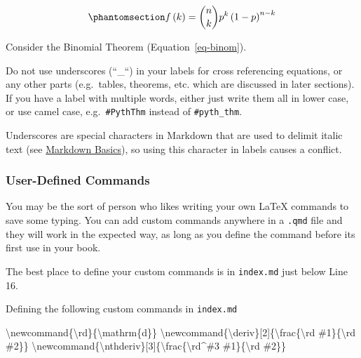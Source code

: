 \documentclass[
  letterpaper,
  oneside]{book}
\newenvironment{Shaded}{\begin{snugshade}}{\end{snugshade}}
\newcommand{\ExtensionTok}[1]{\textcolor[rgb]{0.00,0.23,0.31}{#1}}
\newcommand{\FunctionTok}[1]{\textcolor[rgb]{0.28,0.35,0.67}{#1}}
\newcommand{\NormalTok}[1]{\textcolor[rgb]{0.00,0.23,0.31}{#1}}
\numberwithin{equation}{section}
\numberwithin{figure}{section}
\theoremstyle{break}
\theoremstyle{plain}
\theoremstyle{remark}
\begin{document}
\begin{equation}\phantomsection\label{eq-binom}{
f\left(k\right) = \binom{n}{k} p^k\left(1-p\right)^{n-k}
}\end{equation}

Consider the Binomial Theorem (Equation~\ref{eq-binom}).

Do not use underscores (``\_``) in your labels for cross referencing
equations, or any other parts (e.g.~tables, theorems, etc. which are
discussed in later sections). If you have a label with multiple words,
either just write them all in lower case, or use camel case,
e.g.~\texttt{\#PythThm} instead of \texttt{\#pyth\_thm}.

Underscores are special characters in Markdown that are used to delimit
italic text (see \hyperref[markdown-basics]{Markdown Basics}), so using
this character in labels causes a conflict.

\subsubsection*{User-Defined Commands}\label{user-defined-commands}

You may be the sort of person who likes writing your own LaTeX commands
to save some typing. You can add custom commands anywhere in a
\texttt{.qmd} file and they will work in the expected way, as long as
you define the command before its first use in your book.

The best place to define your custom commands is in \texttt{index.md}
just below Line 16.

Defining the following custom commands in \texttt{index.md}

\begin{Shaded}
\begin{Highlighting}[]
\FunctionTok{\textbackslash{}newcommand}\NormalTok{\{}\ExtensionTok{\textbackslash{}rd}\NormalTok{\}\{}\FunctionTok{\textbackslash{}mathrm}\NormalTok{\{d\}\}}
\FunctionTok{\textbackslash{}newcommand}\NormalTok{\{}\ExtensionTok{\textbackslash{}deriv}\NormalTok{\}[2]\{}\FunctionTok{\textbackslash{}frac}\NormalTok{\{}\FunctionTok{\textbackslash{}rd}\NormalTok{ \#1\}\{}\FunctionTok{\textbackslash{}rd}\NormalTok{ \#2\}\}}
\FunctionTok{\textbackslash{}newcommand}\NormalTok{\{}\ExtensionTok{\textbackslash{}nthderiv}\NormalTok{\}[3]\{}\FunctionTok{\textbackslash{}frac}\NormalTok{\{}\FunctionTok{\textbackslash{}rd}\NormalTok{\^{}\#3 \#1\}\{}\FunctionTok{\textbackslash{}rd}\NormalTok{ \#2\}\}}
\end{Highlighting}
\end{Shaded}
\end{document}

